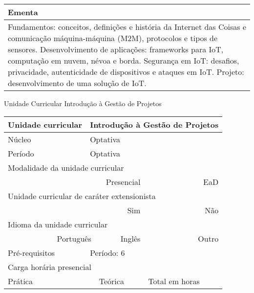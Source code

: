 \begin{quadro}[ht!]
\begin{tabular}{|p{3cm} p{2cm} p{3cm} p{2cm} p{3cm} p{2cm}|}
\multicolumn{6}{|p{15cm}|}{\cellcolor{blue1} Ementa} \\\hline
\hline\multicolumn{6}{|p{15cm}|}{\scriptsize Fundamentos: conceitos, definições e história da Internet das Coisas e comunicação máquina-máquina (M2M), protocolos e tipos de sensores. Desenvolvimento de aplicações: frameworks para IoT, computação em nuvem, névoa e borda. Segurança em IoT: desafios, privacidade, autenticidade de dispositivos e ataques em IoT. Projeto: desenvolvimento de uma solução de IoT.}\\\hline
\hline
	\end{tabular}
\end{quadro}
\clearpage
\newpage\begin{quadro}[ht!]
  \centering\scriptsize
\caption{Unidade Curricular Introdução à Gestão de Projetos}
\label{ unit_54 }
\begin{tabular}{|p{3cm} p{2cm} p{3cm} p{2cm} p{3cm} p{2cm}|}\hline
\multicolumn{1}{|p{3cm}|}{\cellcolor{blue1} Unidade curricular} & \multicolumn{5}{p{9cm}|}{ Introdução à Gestão de Projetos }\\\hline
\multicolumn{1}{|p{3cm}|}{\cellcolor{blue1} Núcleo} & \multicolumn{5}{p{11.5cm}|}{ Optativa }\\\hline
\multicolumn{1}{|p{3cm}|}{\cellcolor{blue1} Período} & \multicolumn{5}{p{9cm}|}{ Optativa }\\\hline
\multicolumn{6}{|p{15cm}|}{\cellcolor{blue1} Modalidade da unidade curricular} \\\hline
\multicolumn{2}{|r}{		} &  \multicolumn{2}{r}{Presencial \XBox } & \multicolumn{2}{r|}{EaD \Square	} \\\hline
\multicolumn{6}{|p{15cm}|}{\cellcolor{blue1} Unidade curricular de caráter extensionista} \\\hline
\multicolumn{4}{|r}{			Sim \Square	} & \multicolumn{2}{r|}{	Não \XBox	}\\\hline
\multicolumn{6}{|p{15cm}|}{\cellcolor{blue1} Idioma da unidade curricular} \\ \hline
\multicolumn{2}{|r}{	Português \XBox	} &  \multicolumn{2}{r}{	Inglês \Square	} & \multicolumn{2}{r|}{	Outro \Square	} \\ \hline
\multicolumn{1}{|p{3cm}|}{\cellcolor{blue1} Pré-requisitos} & \multicolumn{5}{p{9cm}|}{ Período: 6 }\\ \hline
\multicolumn{6}{|p{15cm}|}{\cellcolor{blue1} Carga horária presencial} \\ \hline
\multicolumn{1}{|p{3cm}|}{\raggedleft Prática} & \multicolumn{1}{p{1cm}|}{\centering	30	} &  \multicolumn{1}{p{3cm}|}{\raggedleft Teórica}  & \multicolumn{1}{p{1cm}|}{\centering 	30 } & \multicolumn{1}{p{3cm}|}{\raggedleft Total em horas} & \multicolumn{1}{p{1cm}|}{\raggedleft	60	} \\ \hline

\end{tabular}
\end{quadro}
